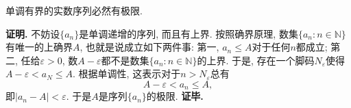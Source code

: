 
\begin{theorem}{}
单调有界的实数序列必然有极限.
\end{theorem}
\textbf{证明.} 不妨设$\{a_n\}$是单调递增的序列, 而且有上界. 按照确界原理, 数集$\{a_n:n\in\mathbb{N}\}$有唯一的上确界$A$, 也就是说成立如下两件事: 第一, $a_n\leq A$对于任何$n$都成立; 第二, 任给$\varepsilon>0$, 数$A-\varepsilon$都不是数集$\{a_n:n\in\mathbb{N}\}$的上界. 于是, 存在一个脚码$N_\varepsilon$使得$A-\varepsilon<a_N\leq A$. 根据单调性, 这表示对于$n>N_\varepsilon$总有
\[A-\varepsilon<a_n\leq A,\]
即$|a_n-A|<\varepsilon$. 于是$A$是序列$\{a_n\}$的极限. \textbf{证毕.}

